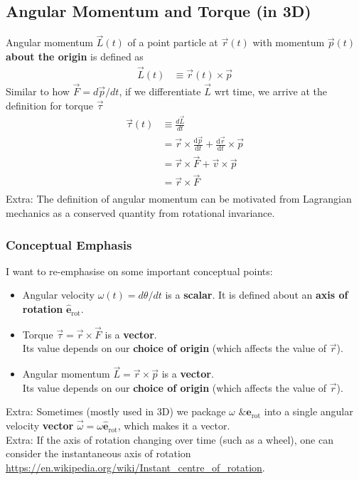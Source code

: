 \documentclass{article}
\begin{document}
\subsection{Angular Momentum and Torque (in 3D)}
Angular momentum $\vec{L}(t)$ of a point particle at $\vec{r}(t)$ with momentum $\vec{p}(t)$ \textbf{about the origin} is defined as 
\begin{align}
    \vec{L}(t) &\equiv \vec{r}(t) \times \vec{p}
\end{align}
Similar to how $\vec{F} = d\vec{p}/dt$, if we differentiate $\vec{L}$ wrt time, we arrive at the definition for torque $\vec{\tau}$
\begin{align}
    \vec{\tau}(t) &\equiv \frac{d\vec{L}}{dt}  \\
    &=\vec{r} \times \frac{\mathrm{d} \vec{p}}{\mathrm{d} t}+\frac{\mathrm{d} \vec{r}}{\mathrm{d} t} \times \vec{p}\\
&=\vec{r} \times \vec{F}+\vec{v} \times \vec{p}\\
&=\vec{r} \times \vec{F}\\
\end{align}
Extra: The definition of angular momentum can be motivated from Lagrangian mechanics as a conserved quantity from rotational invariance.
\subsubsection{Conceptual Emphasis}
I want to re-emphasise on some important conceptual points:
\begin{itemize}
    \item Angular velocity $\omega(t) = d\theta/dt$ is a \textbf{scalar}. It is defined about an \textbf{axis of rotation} $\mathbf{\hat{e}}_{\text{rot}}$.
    \item Torque $\vec{\tau} =\vec{r} \times \vec{F}$ is a \textbf{vector}. \\ Its value depends on our \textbf{choice of origin} (which affects the value of $\vec{r}$).
    \item Angular momentum $\vec{L} = \vec{r} \times \vec{p}$ is a \textbf{vector}. \\ Its value depends on our \textbf{choice of origin} (which affects the value of $\vec{r}$).
\end{itemize}
Extra: Sometimes (mostly used in 3D) we package $\omega \text{ \& } \mathbf{e}_{\text{rot}}$ into a single angular velocity \textbf{vector} $\vec{\omega} = \omega \mathbf{\hat{e}}_{\text{rot}}$, which makes it a vector. \\[10pt]
Extra: If the axis of rotation changing over time (such as a wheel), one can consider the instantaneous axis of rotation \url{https://en.wikipedia.org/wiki/Instant_centre_of_rotation}.
\end{document}

